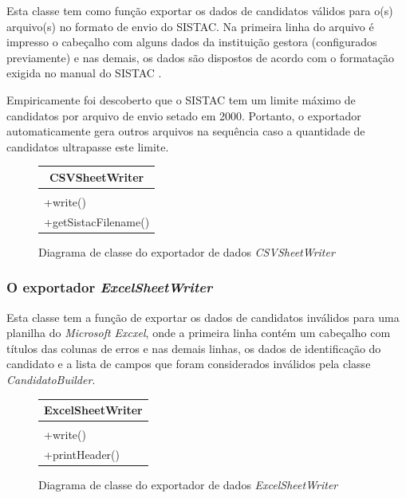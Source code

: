 \documentclass[
	12pt,			%
	openright,		%
	oneside,	
	a4paper,		%
	english,		%
	brazil			%
]{abntex2/abntex2}  %
\begin{document}
	Esta classe tem como função exportar os dados de candidatos válidos para o(s) arquivo(s) no formato de envio do SISTAC. Na primeira linha do arquivo é impresso o cabeçalho com alguns dados da instituição gestora (configurados previamente) e nas demais, os dados são dispostos de acordo com o formatação exigida no manual do SISTAC \cite{sistac-formatos}.
	
	Empiricamente foi descoberto que o SISTAC tem um limite máximo de candidatos por arquivo de envio setado em 2000. Portanto, o exportador automaticamente gera outros arquivos na sequência caso a quantidade de candidatos ultrapasse este limite.
	
	\begin{figure}[H]
		\begin{center}
			
			\caption{Diagrama de classe do exportador de dados \textit{CSVSheetWriter}}
			\label{csvwriter-uml}
			
			\begin{tabular}{|l|}
				\hline
				\multicolumn{1}{|c|}{\textbf{CSVSheetWriter}} \\ \hline
				\\ \hline
				+write()                                      \\
				+getSistacFilename()                          \\ \hline
			\end{tabular}
			
		\end{center}
	\end{figure}
	
	\subsubsection{O exportador \textit{ExcelSheetWriter}}
	
	Esta classe tem a função de exportar os dados de candidatos inválidos para uma planilha do \textit{Microsoft Excxel}, onde a primeira linha contém um cabeçalho com títulos das colunas de erros e nas demais linhas, os dados de identificação do candidato e a lista de campos que foram considerados inválidos pela classe \textit{CandidatoBuilder}.
	
	\begin{figure}[H]
		\begin{center}
			
			\caption{Diagrama de classe do exportador de dados \textit{ExcelSheetWriter}}
			\label{excelwriter-uml}
			
			\begin{tabular}{|l|}
				\hline
				\multicolumn{1}{|c|}{\textbf{ExcelSheetWriter}} \\ \hline
				\\ \hline
				+write()                                      \\
				+printHeader()                          \\ \hline
			\end{tabular}
			
		\end{center}
	\end{figure}
	
\end{document}
